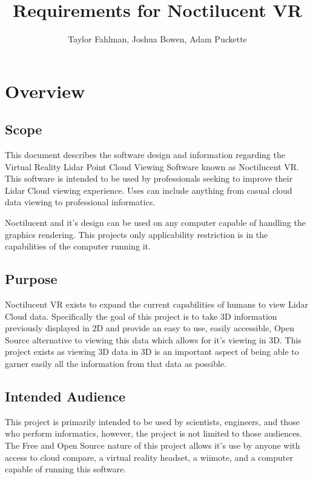 \documentclass{article}
\begin{document}
\title {Requirements for Noctilucent VR}
\author {Taylor Fahlman, Joshua Bowen, Adam Puckette}

\maketitle

\abstract

\newpage
\thispagestyle{empty}
\mbox{}

\section{Overview}
\subsection{Scope}

This document describes the software design and information regarding the Virtual Reality Lidar Point Cloud Viewing Software known as Noctilucent VR.
This software is intended to be used by professionals seeking to improve their Lidar Cloud viewing experience.
Uses can include anything from casual cloud data viewing to professional informatics.

Noctilucent and it's design can be used on any computer capable of handling the graphics rendering.
This projects only applicability restriction is in the capabilities of the computer running it.

\subsection{Purpose}

Noctilucent VR exists to expand the current capabilities of humans to view Lidar Cloud data.
Specifically the goal of this project is to take 3D information previously displayed in 2D and provide an easy to use, easily accessible, Open Source alternative to viewing this data which allows for it's viewing in 3D.
This project exists as viewing 3D data in 3D is an important aspect of being able to garner easily all the information from that data as possible.

\subsection{Intended Audience}

This project is primarily intended to be used by scientists, engineers, and those who perform informatics, however, the project is not limited to those audiences.
The Free and Open Source nature of this project allows it's use by anyone with access to cloud compare, a virtual reality headset, a wiimote, and a computer capable of running this software.
\end{document}
